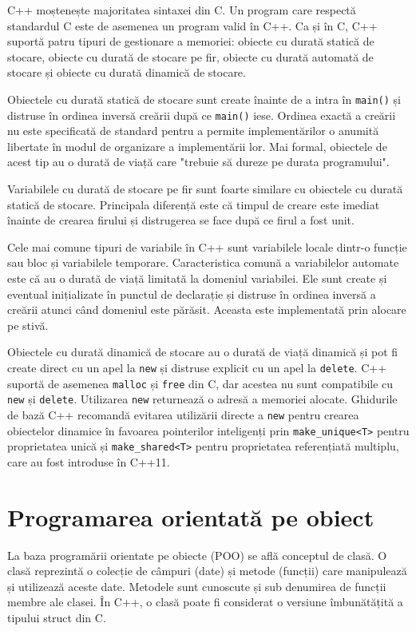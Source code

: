\documentclass[a4paper,12pt]{report}
\begin{document}
C++ moștenește majoritatea sintaxei din C. Un program care respectă standardul C este de asemenea un program valid în C++. Ca și în C, C++ suportă patru tipuri de gestionare a memoriei: obiecte cu durată statică de stocare, obiecte cu durată de stocare pe fir, obiecte cu durată automată de stocare și obiecte cu durată dinamică de stocare.

Obiectele cu durată statică de stocare sunt create înainte de a intra în \texttt{main()} și distruse în ordinea inversă creării după ce \texttt{main()} iese. Ordinea exactă a creării nu este specificată de standard pentru a permite implementărilor o anumită libertate în modul de organizare a implementării lor. Mai formal, obiectele de acest tip au o durată de viață care "trebuie să dureze pe durata programului".

Variabilele cu durată de stocare pe fir sunt foarte similare cu obiectele cu durată statică de stocare. Principala diferență este că timpul de creare este imediat înainte de crearea firului și distrugerea se face după ce firul a fost unit.

Cele mai comune tipuri de variabile în C++ sunt variabilele locale dintr-o funcție sau bloc și variabilele temporare. Caracteristica comună a variabilelor automate este că au o durată de viață limitată la domeniul variabilei. Ele sunt create și eventual inițializate în punctul de declarație și distruse în ordinea inversă a creării atunci când domeniul este părăsit. Aceasta este implementată prin alocare pe stivă.

Obiectele cu durată dinamică de stocare au o durată de viață dinamică și pot fi create direct cu un apel la \texttt{new} și distruse explicit cu un apel la \texttt{delete}. C++ suportă de asemenea \texttt{malloc} și \texttt{free} din C, dar acestea nu sunt compatibile cu \texttt{new} și \texttt{delete}. Utilizarea \texttt{new} returnează o adresă a memoriei alocate. Ghidurile de bază C++ recomandă evitarea utilizării directe a \texttt{new} pentru crearea obiectelor dinamice în favoarea pointerilor inteligenți prin \texttt{make\_unique<T>} pentru proprietatea unică și \texttt{make\_shared<T>} pentru proprietatea referențiată multiplu, care au fost introduse în C++11.

\section{Programarea orientată pe obiect}
La baza programării orientate pe obiecte (POO) se află conceptul de clasă. O clasă reprezintă o colecție de câmpuri (date) și metode (funcții) care manipulează și utilizează aceste date. Metodele sunt cunoscute și sub denumirea de funcții membre ale clasei. În C++, o clasă poate fi considerat o versiune îmbunătățită a tipului struct din C.
\end{document}
